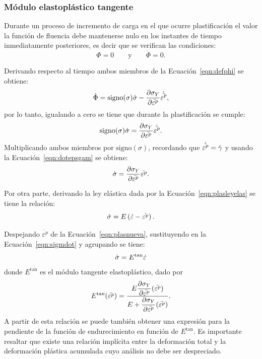 \subsubsection{Módulo elastoplástico tangente}

Durante un proceso de incremento de carga en el que ocurre plastificación el valor la función de fluencia debe mantenerse nulo en los instantes de tiempo inmediatamente posteriores, es decir que se verifican las condiciones:
%
\begin{equation}
\Phi = 0 \qquad \text{y} \qquad \dot{ \Phi} = 0.
\end{equation}

Derivando respecto al tiempo ambos miembros de la Ecuación~\eqref{eqn:defphi} se obtiene:
\begin{equation}
\dot{ \Phi} = \text{signo} (\sigma ) \dot{ \sigma} - \frac{\partial \sigma_Y}{\partial \bar{ \varepsilon^p} } \dot{ \bar{ \varepsilon^p}},
\end{equation}
%
por lo tanto, igualando a cero se tiene que durante la plastificación se cumple:
%
\begin{equation}\label{eqn:plaseq}
 \text{signo} (\sigma ) \dot{ \sigma} = \frac{\partial \sigma_Y}{\partial \bar{ \varepsilon^p} } \dot{ \bar{ \varepsilon^p}}.
\end{equation}
%
Multiplicando ambos miembros por $\text{signo}(\sigma)$, recordando que $\dot{ \bar{ \varepsilon^p}} = \dot{ \gamma}$ y usando la Ecuación~\eqref{eqn:dotepsgam} se obtiene:
\begin{equation}\label{eqn:plasnueva}
\dot{ \sigma} = \frac{\partial \sigma_Y}{\partial \bar{ \varepsilon^p} } \dot{ \varepsilon^p}.
\end{equation}

Por otra parte, derivando la ley elástica dada por la Ecuación~\eqref{eqn:plasleyelas} se tiene la relación:
%
\begin{equation}\label{eqn:sigmdot}
  \dot{ \sigma} = E \left( \dot{ \varepsilon} -  \dot{ \varepsilon^p} \right).
\end{equation}
%

Despejando $\dot{ \varepsilon^p}$ de la Ecuación~\eqref{eqn:plasnueva}, sustituyendo en la Ecuación~\eqref{eqn:sigmdot} y agrupando se tiene:
%
\begin{equation}
\dot{ \sigma} = E^{\text{tan}} \dot{ \varepsilon}
\end{equation}
%
donde $E^{\text{tan}}$ es el módulo tangente elastoplástico, dado por
%
\begin{equation} \label{eqn:Etan}
E^{\text{tan}} (\bar{ \varepsilon^p}) = \frac{E \dfrac{\partial \sigma_Y}{\partial \bar{ \varepsilon^p} } (\bar{ \varepsilon^p}) }{E + \dfrac{\partial \sigma_Y}{\partial \bar{ \varepsilon^p}  } (\bar{ \varepsilon^p}) }.
\end{equation}
%
A partir de esta relación se puede también obtener una expresión para la pendiente de la función de endurecimiento en función de $E^{\text{tan}}$. %
%
Es importante resaltar que existe una relación implícita entre la deformación total y la deformación plástica acumulada cuyo análisis no debe ser despreciado.


